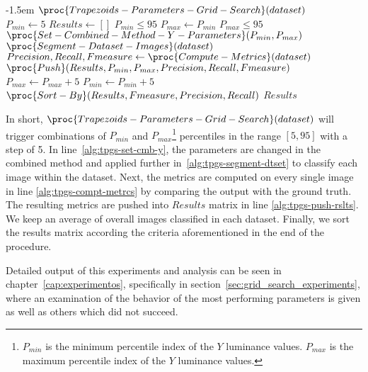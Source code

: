 \begin{codebox}
\kern-1.5em $\proc{Trapezoids-Parameters-Grid-Search}(dataset)$\\
\li $P_{min} \gets 5$
\li $Results \gets []$
\li
\li \While $P_{min} \leq 95$
\li \Do
        $P_{max} \gets P_{min}$
\li     \While $P_{max} \leq 95$
\li     \Do
            $\proc{Set-Combined-Method-Y-Parameters}(P_{min}, P_{max})$ \label{alg:tpgs-set-cmb-y}
\li         $\proc{Segment-Dataset-Images}(dataset)$    \label{alg:tpgs-segment-dtset}
\li         $Precision, Recall, Fmeasure \gets \proc{Compute-Metrics}(dataset)$ \label{alg:tpgs-compt-metrcs}
\li         $\proc{Push}(Results, P_{min}, P_{max}, Precision, Recall, Fmeasure)$ \label{alg:tpgs-push-rslts}
\li\li      $P_{max} \gets P_{max} + 5$
        \End
\li      $P_{min} \gets P_{min} + 5$
    \End
\li
\li $\proc{Sort-By}(Results, Fmeasure, Precision, Recall)$
\li \Return $Results$
\end{codebox}


\newpage

In short, $\proc{Trapezoids-Parameters-Grid-Search}(dataset)$ will trigger combinations of $P_{min}$ and $P_{max}$\footnote{$P_{min}$ is the minimum percentile index of the $Y$ luminance values. $P_{max}$ is the maximum percentile index of the $Y$ luminance values.} percentiles in the range $[5, 95]$ with a step of 5. In line~\ref{alg:tpgs-set-cmb-y}, the parameters are changed in the combined method and applied further in~\ref{alg:tpgs-segment-dtset} to classify each image within the dataset. Next, the metrics are computed on every single image in line \ref{alg:tpgs-compt-metrcs} by comparing the output with the ground truth. The resulting metrics are pushed into $Results$ matrix in line \ref{alg:tpgs-push-rslts}. We keep an average of overall images classified in each dataset. Finally, we sort the results matrix according the criteria aforementioned in the end of the procedure.

Detailed output of this experiments and analysis can be seen in chapter~\ref{cap:experimentos}, specifically in section~\ref{sec:grid_search_experiments}, where an examination of the behavior of the most performing parameters is given as well as others which did not succeed.